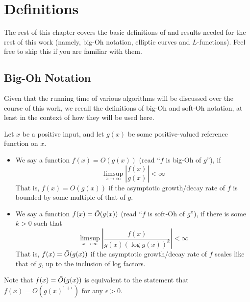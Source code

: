 \newpage
\section{Definitions}

The rest of this chapter covers the basic definitions of and results needed for the rest of this work (namely, big-Oh notation, elliptic curves and $L$-functions). Feel free to skip this if you are familiar with them.

\subsection{Big-Oh Notation}

Given that the running time of various algorithms will be discussed over the course of this work, we recall the definitions of big-Oh and soft-Oh notation, at least in the context of how they will be used here.

\begin{definition}
Let $x$ be a positive input, and let $g(x)$ be some positive-valued reference function on $x$.
\begin{itemize}
\item We say a function $f(x) = O(g(x))$ (read ``$f$ is big-Oh of $g$''), if
\begin{equation}
\limsup_{x \to \infty} \left| \frac{f(x)}{g(x)}\right| < \infty
\end{equation}
That is, $f(x) = O(g(x))$ if the asymptotic growth/decay rate of $f$ is bounded by some multiple of that of $g$.
\item We say a function $f(x) = \tilde{O}(g(x))$ (read ``$f$ is soft-Oh of $g$''), if there is some $k>0$ such that
\begin{equation}
\limsup_{x \to \infty} \left| \frac{f(x)}{g(x)\left(\log g(x)\right)^k}\right| < \infty
\end{equation}
That is, $f(x) = \tilde{O}(g(x))$ if the asymptotic growth/decay rate of $f$ scales like that of $g$, up to the inclusion of log factors.
\end{itemize}
\end{definition}
Note that $f(x) = \tilde{O}(g(x))$ is equivalent to the statement that $f(x) = O(g(x)^{1+\epsilon})$ for any $\epsilon>0$. \\

